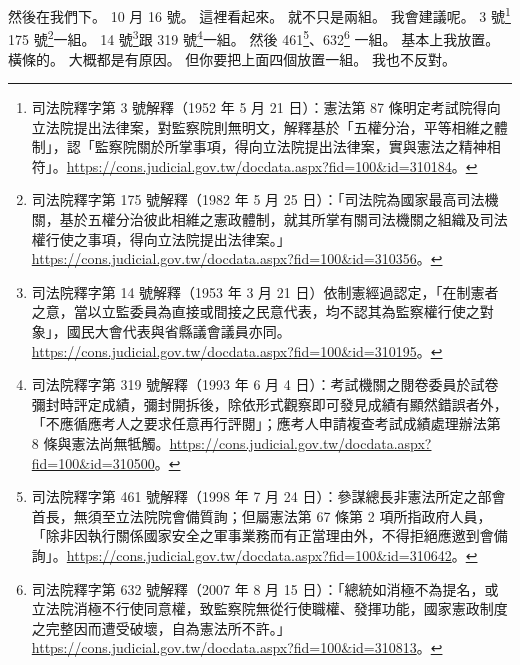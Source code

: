 \hypertarget{c01:cue:1520}{}然後在我們下。
\hypertarget{c01:cue:1521}{}10 月 16 號。
\hypertarget{c01:cue:1522}{}這裡看起來。
\hypertarget{c01:cue:1523}{}就不只是兩組。
\hypertarget{c01:cue:1524}{}我會建議呢。
\hypertarget{c01:cue:1525}{}3 號\footnote{司法院釋字第 3 號解釋（1952 年 5 月 21 日）：憲法第 87 條明定考試院得向立法院提出法律案，對監察院則無明文，解釋基於「五權分治，平等相維之體制」，認「監察院關於所掌事項，得向立法院提出法律案，實與憲法之精神相符」。\url{https://cons.judicial.gov.tw/docdata.aspx?fid=100&id=310184}。} 175 號\footnote{司法院釋字第 175 號解釋（1982 年 5 月 25 日）：「司法院為國家最高司法機關，基於五權分治彼此相維之憲政體制，就其所掌有關司法機關之組織及司法權行使之事項，得向立法院提出法律案。」\url{https://cons.judicial.gov.tw/docdata.aspx?fid=100&id=310356}。}一組。
\hypertarget{c01:cue:1526}{}14 號\footnote{司法院釋字第 14 號解釋（1953 年 3 月 21 日）依制憲經過認定，「在制憲者之意，當以立監委員為直接或間接之民意代表，均不認其為監察權行使之對象」，國民大會代表與省縣議會議員亦同。\url{https://cons.judicial.gov.tw/docdata.aspx?fid=100&id=310195}。}跟 319 號\footnote{司法院釋字第 319 號解釋（1993 年 6 月 4 日）：考試機關之閱卷委員於試卷彌封時評定成績，彌封開拆後，除依形式觀察即可發見成績有顯然錯誤者外，「不應循應考人之要求任意再行評閱」；應考人申請複查考試成績處理辦法第 8 條與憲法尚無牴觸。\url{https://cons.judicial.gov.tw/docdata.aspx?fid=100&id=310500}。}一組。
\hypertarget{c01:cue:1527}{}然後 461\footnote{司法院釋字第 461 號解釋（1998 年 7 月 24 日）：參謀總長非憲法所定之部會首長，無須至立法院院會備質詢；但屬憲法第 67 條第 2 項所指政府人員，「除非因執行關係國家安全之軍事業務而有正當理由外，不得拒絕應邀到會備詢」。\url{https://cons.judicial.gov.tw/docdata.aspx?fid=100&id=310642}。}、632\footnote{司法院釋字第 632 號解釋（2007 年 8 月 15 日）：「總統如消極不為提名，或立法院消極不行使同意權，致監察院無從行使職權、發揮功能，國家憲政制度之完整因而遭受破壞，自為憲法所不許。」\url{https://cons.judicial.gov.tw/docdata.aspx?fid=100&id=310813}。} 一組。
\hypertarget{c01:cue:1528}{}基本上我放置。
\hypertarget{c01:cue:1529}{}橫條的。
\hypertarget{c01:cue:1530}{}大概都是有原因。
\hypertarget{c01:cue:1531}{}但你要把上面四個放置一組。
\hypertarget{c01:cue:1532}{}我也不反對。


